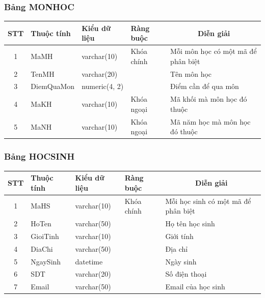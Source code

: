 \documentclass[a4paper]{article}
\begin{document}
\subsubsection{Bảng MONHOC}
\begin{table}[H]
\centering
\renewcommand{\arraystretch}{1.5}
\setlength{\tabcolsep}{12pt}
\begin{tabular}{|c|l|l|l|p{5cm}|}
\hline
\textbf{STT} & \textbf{Thuộc tính} & \textbf{Kiểu dữ liệu} & \textbf{Ràng buộc} & \multicolumn{1}{|c|}{\textbf{Diễn giải}} \\
\hline
1 & MaMH & varchar(10) & Khóa chính & Mỗi môn học có một mã để phân biệt \\
\hline
2 & TenMH & varchar(20) & & Tên môn học \\
\hline
3 & DiemQuaMon & numeric(4, 2) & & Điểm cần để qua môn \\
\hline
4 & MaKH & varchar(10) & Khóa ngoại & Mã khối mà môn học đó thuộc \\
\hline
5 & MaNH & varchar(10) & Khóa ngoại & Mã năm học mà môn học đó thuộc \\
\hline
\end{tabular}
\end{table}

\subsubsection{Bảng HOCSINH}
\begin{table}[H]
\centering
\renewcommand{\arraystretch}{1.5}
\setlength{\tabcolsep}{12pt}
\begin{tabular}{|c|l|l|l|p{5cm}|}
\hline
\textbf{STT} & \textbf{Thuộc tính} & \textbf{Kiểu dữ liệu} & \textbf{Ràng buộc} & \multicolumn{1}{|c|}{\textbf{Diễn giải}} \\
\hline
1 & MaHS & varchar(10) & Khóa chính & Mỗi học sinh có một mã để phân biệt \\
\hline
2 & HoTen & varchar(50) & & Họ tên học sinh \\
\hline
3 & GioiTinh & varchar(10) & & Giới tính \\
\hline
4 & DiaChi & varchar(50) & & Địa chỉ \\
\hline
5 & NgaySinh & datetime & & Ngày sinh \\
\hline
6 & SDT & varchar(20) & & Số điện thoại \\
\hline 
7 & Email & varchar(50) & & Email của học sinh \\
\hline
\end{tabular}
\end{table}
\end{document}
